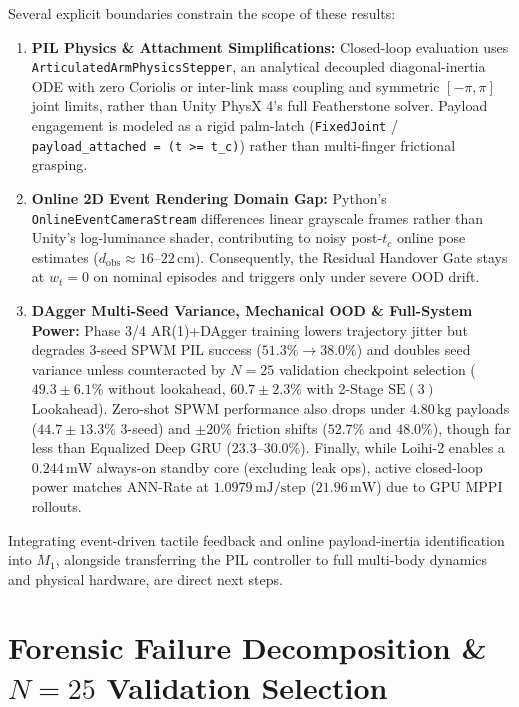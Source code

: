 \documentclass[11pt]{article}
\begin{document}
Several explicit boundaries constrain the scope of these results:

\begin{enumerate}
    \item \textbf{PIL Physics \& Attachment Simplifications:} Closed-loop evaluation uses \texttt{ArticulatedArmPhysicsStepper}, an analytical decoupled diagonal-inertia ODE with zero Coriolis or inter-link mass coupling and symmetric $[-\pi, \pi]$ joint limits, rather than Unity PhysX 4's full Featherstone solver. Payload engagement is modeled as a rigid palm-latch (\texttt{FixedJoint} / \texttt{payload\_attached = (t >= t\_c)}) rather than multi-finger frictional grasping.
    \item \textbf{Online 2D Event Rendering Domain Gap:} Python's \texttt{OnlineEventCameraStream} differences linear grayscale frames rather than Unity's log-luminance shader, contributing to noisy post-$t_c$ online pose estimates ($d_{\text{obs}} \approx 16\text{--}22\,\text{cm}$). Consequently, the Residual Handover Gate stays at $w_t = 0$ on nominal episodes and triggers only under severe OOD drift.
    \item \textbf{DAgger Multi-Seed Variance, Mechanical OOD \& Full-System Power:} Phase 3/4 AR(1)+DAgger training lowers trajectory jitter but degrades 3-seed SPWM PIL success ($51.3\% \to 38.0\%$) and doubles seed variance unless counteracted by $N=25$ validation checkpoint selection ($49.3 \pm 6.1\%$ without lookahead, $60.7 \pm 2.3\%$ with 2-Stage $\text{SE}(3)$ Lookahead). Zero-shot SPWM performance also drops under $4.80\,\text{kg}$ payloads ($44.7 \pm 13.3\%$ 3-seed) and $\pm 20\%$ friction shifts ($52.7\%$ and $48.0\%$), though far less than Equalized Deep GRU ($23.3\text{--}30.0\%$). Finally, while Loihi-2 enables a $0.244\,\text{mW}$ always-on standby core (excluding leak ops), active closed-loop power matches ANN-Rate at $1.0979\,\text{mJ/step}$ ($21.96\,\text{mW}$) due to GPU MPPI rollouts.
\end{enumerate}

Integrating event-driven tactile feedback and online payload-inertia identification into $M_1$, alongside transferring the PIL controller to full multi-body dynamics and physical hardware, are direct next steps.

\appendix

\section{Forensic Failure Decomposition \& $N=25$ Validation Selection}
\end{document}
